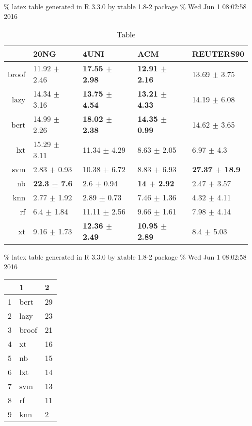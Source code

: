 \documentclass[]{article}
\begin{document}
\% latex table generated in R 3.3.0 by xtable 1.8-2 package \% Wed Jun 1
08:02:58 2016

\begin{table}[ht]
\centering
\begin{tabular}{rllll}
  \hline
 & 20NG & 4UNI & ACM & REUTERS90 \\ 
  \hline
broof & 11.92 $\pm$  2.46 & \bf{17.55 $\pm$  2.98} & \bf{12.91 $\pm$  2.16} & 13.69 $\pm$  3.75 \\ 
  lazy & 14.34 $\pm$  3.16 & \bf{13.75 $\pm$  4.54} & \bf{13.21 $\pm$  4.33} & 14.19 $\pm$  6.08 \\ 
  bert & 14.99 $\pm$  2.26 & \bf{18.02 $\pm$  2.38} & \bf{14.35 $\pm$  0.99} & 14.62 $\pm$  3.65 \\ 
  lxt & 15.29 $\pm$  3.11 & 11.34 $\pm$  4.29 & 8.63 $\pm$  2.05 & 6.97 $\pm$  4.3 \\ 
  svm & 2.83 $\pm$  0.93 & 10.38 $\pm$  6.72 & 8.83 $\pm$  6.93 & \bf{27.37 $\pm$  18.9} \\ 
  nb & \bf{22.3 $\pm$  7.6} & 2.6 $\pm$  0.94 & \bf{14 $\pm$  2.92} & 2.47 $\pm$  3.57 \\ 
  knn & 2.77 $\pm$  1.92 & 2.89 $\pm$  0.73 & 7.46 $\pm$  1.36 & 4.32 $\pm$  4.11 \\ 
  rf & 6.4 $\pm$  1.84 & 11.11 $\pm$  2.56 & 9.66 $\pm$  1.61 & 7.98 $\pm$  4.14 \\ 
  xt & 9.16 $\pm$  1.73 & \bf{12.36 $\pm$  2.49} & \bf{10.95 $\pm$  2.89} & 8.4 $\pm$  5.03 \\ 
   \hline
\end{tabular}
\caption{Table} 
\label{tab:tab}
\end{table}

\% latex table generated in R 3.3.0 by xtable 1.8-2 package \% Wed Jun 1
08:02:58 2016

\begin{table}[ht]
\centering
\begin{tabular}{rll}
  \hline
 & 1 & 2 \\ 
  \hline
1 & bert & 29 \\ 
  2 & lazy & 23 \\ 
  3 & broof & 21 \\ 
  4 & xt & 16 \\ 
  5 & nb & 15 \\ 
  6 & lxt & 14 \\ 
  7 & svm & 13 \\ 
  8 & rf & 11 \\ 
  9 & knn & 2 \\ 
   \hline
\end{tabular}
\end{table}
\end{document}
